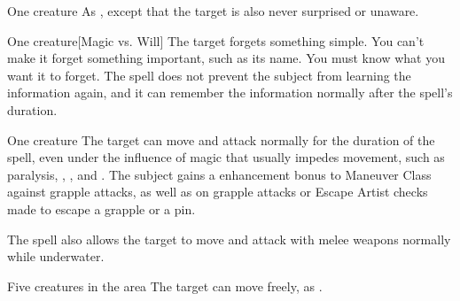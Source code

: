 \begin{spelltarget}{One creature}
    \spelleffect As , except that the target is also never surprised or unaware.
\end{spelltarget}

\spellrng{\rngmed}
\spelldur{\durlong}
\begin{spelltarget}{One creature}[Magic vs. Will]
    \spelleffect The target forgets something simple. You can't make it forget something important, such as its name. You must know what you want it to forget. The spell does not prevent the subject from learning the information again, and it can remember the information normally after the spell's duration.
\end{spelltarget}

\spellrng{\rngtouch}
\spelldur{\durshort}
\begin{spelltarget}{One creature}
    \spelleffect The target can move and attack normally for the duration of the spell, even under the influence of magic that usually impedes movement, such as paralysis, , , and . The subject gains a  enhancement bonus to Maneuver Class against grapple attacks, as well as on grapple attacks or Escape Artist checks made to escape a grapple or a pin.
    \par The spell also allows the target to move and attack with melee weapons normally while underwater.
\end{spelltarget}

\begin{spelltargets}{Five creatures in the area}
    \spelleffect The target can move freely, as .
\end{spelltargets}

\begin{comment}
\subsubsection{G}
\end{comment}

